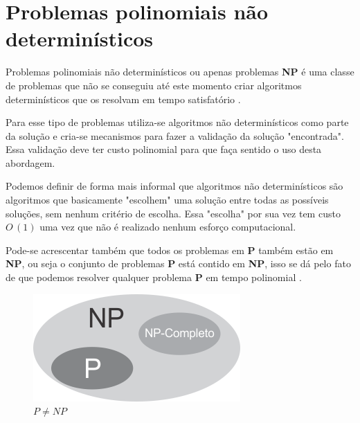 \section{Problemas polinomiais não determinísticos}
Problemas polinomiais não determinísticos ou apenas problemas \textbf{NP} é uma classe de problemas que não se conseguiu até este momento criar algoritmos determinísticos que os resolvam em tempo satisfatório \cite{goodrichprojeto}. 

Para esse tipo de problemas utiliza-se algoritmos não determinísticos como parte da solução e cria-se mecanismos para fazer a validação da solução "encontrada". Essa validação deve ter custo polinomial para que faça sentido o uso desta abordagem. 

Podemos definir de forma mais informal que algoritmos não determinísticos são algoritmos que basicamente "escolhem" uma solução entre todas as possíveis soluções, sem nenhum critério de escolha. Essa "escolha" por sua vez tem custo $O\,(1)$ uma vez que não é realizado nenhum esforço computacional.

Pode-se acrescentar também que todos os problemas em \textbf{P} também estão em \textbf{NP}, ou seja o conjunto de problemas \textbf{P} está contido em \textbf{NP}, isso se dá pelo fato de que podemos resolver qualquer problema \textbf{P} em tempo polinomial \cite{leisersonalgoritmos}.

\begin{figure}[H]
	\centering
	\label{fig1}
	\includegraphics[scale=2]{./figuras/figProblemas.png}
	\caption{$P \neq NP$ \cite{VIEIRA2001}}
\end{figure}
